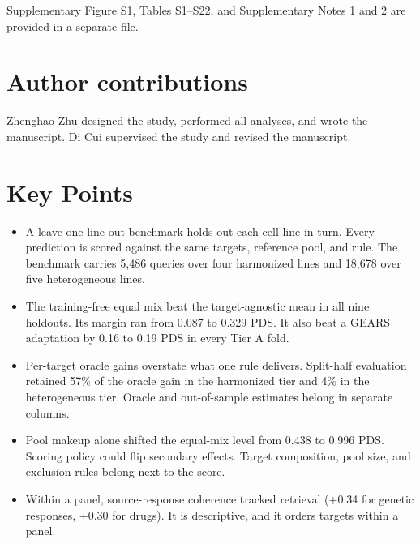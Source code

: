 \documentclass[12pt]{article}
\begin{document}
Supplementary Figure S1, Tables S1--S22, and Supplementary Notes 1 and 2 are provided in a separate file.

\section*{Author contributions}

Zhenghao Zhu designed the study, performed all analyses, and wrote the manuscript. Di Cui supervised the study and revised the manuscript.

\section*{Key Points}

\begin{itemize}
\item A leave-one-line-out benchmark holds out each cell line in turn. Every prediction is scored against the same targets, reference pool, and rule. The benchmark carries 5,486 queries over four harmonized lines and 18,678 over five heterogeneous lines.
\item The training-free equal mix beat the target-agnostic mean in all nine holdouts. Its margin ran from 0.087 to 0.329 PDS. It also beat a GEARS adaptation by 0.16 to 0.19 PDS in every Tier A fold.
\item Per-target oracle gains overstate what one rule delivers. Split-half evaluation retained 57\% of the oracle gain in the harmonized tier and 4\% in the heterogeneous tier. Oracle and out-of-sample estimates belong in separate columns.
\item Pool makeup alone shifted the equal-mix level from 0.438 to 0.996 PDS. Scoring policy could flip secondary effects. Target composition, pool size, and exclusion rules belong next to the score.
\item Within a panel, source-response coherence tracked retrieval (+0.34 for genetic responses, +0.30 for drugs). It is descriptive, and it orders targets within a panel.
\end{itemize}
\end{document}
